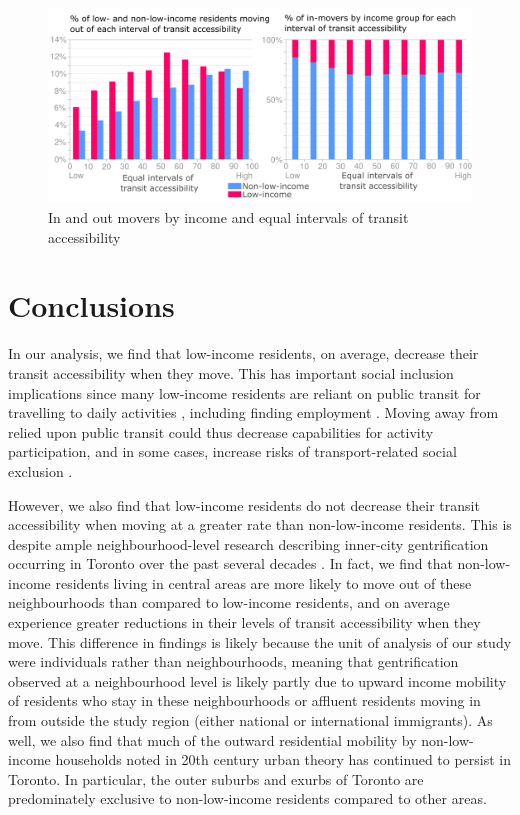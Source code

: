 \begin{figure}[H]
	\centering
	\includegraphics[width=1\linewidth]{figures/res_acc_inc_bars.png}
	\caption{{In and out movers by income and equal intervals of transit accessibility}}
	\label{fig:res_acc_inc}
\end{figure}





\section{Conclusions}

In our analysis, we find that low-income residents, on average, decrease their transit accessibility when they move. This has important social inclusion implications since many low-income residents are reliant on public transit for travelling to daily activities \cite{allen_planning_2020,barri_can_2021}, including finding employment \cite{fransen_relationship_2019,bastiaanssen_does_2021}. Moving away from relied upon public transit could thus decrease capabilities for activity participation, and in some cases, increase risks of transport-related social exclusion \cite{lucas_transport_2012,allen_planning_2020}.

However, we also find that low-income residents do not decrease their transit accessibility when moving at a greater rate than non-low-income residents. This is despite ample neighbourhood-level research describing inner-city gentrification occurring in Toronto over the past several decades \cite{hulchanski_three_2010,walks_gentrification_2021}. In fact, we find that non-low-income residents living in central areas are more likely to move out of these neighbourhoods than compared to low-income residents, and on average experience greater reductions in their levels of transit accessibility when they move. This difference in findings is likely because the unit of analysis of our study were individuals rather than neighbourhoods, meaning that gentrification observed at a neighbourhood level is likely partly due to upward income mobility of residents who stay in these neighbourhoods or affluent residents moving in from outside the study region (either national or international immigrants). As well, we also find that much of the outward residential mobility by non-low-income households noted in 20th century urban theory \cite{burgess_growth_1925,alonso_location_1964} has continued to persist in Toronto. In particular, the outer suburbs and exurbs of Toronto are predominately exclusive to non-low-income residents compared to other areas. 

